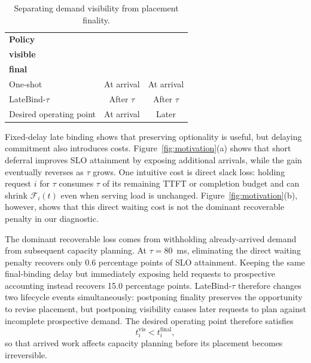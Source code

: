 \documentclass[letterpaper,twocolumn,10pt]{article}
\begin{document}
\begin{table}[t]
    \centering
    \small
    \caption{Separating demand visibility from placement finality.}
    \label{tab:problem:operating-points}

    \renewcommand{\arraystretch}{1.25}

    \begin{tabular*}{\columnwidth}{
        @{\extracolsep{\fill}}
        lcc
        @{}
    }
        \toprule
        \textbf{Policy} &
        \makecell{\textbf{Demand}\\\textbf{visible}} &
        \makecell{\textbf{Placement}\\\textbf{final}} \\
        \midrule
        One-shot                & At arrival   & At arrival   \\
        LateBind-$\tau$         & After $\tau$ & After $\tau$ \\
        Desired operating point & At arrival   & Later        \\
        \bottomrule
    \end{tabular*}
\end{table}

Fixed-delay late binding shows that preserving optionality is useful, but
delaying commitment also introduces costs.
Figure~\ref{fig:motivation}(a) shows that short deferral improves SLO attainment
by exposing additional arrivals, while the gain eventually reverses as
$\tau$ grows.
One intuitive cost is direct slack loss: holding request $i$ for $\tau$
consumes $\tau$ of its remaining TTFT or completion budget and can shrink
$\mathcal{F}_i(t)$ even when serving load is unchanged.
Figure~\ref{fig:motivation}(b), however, shows that this direct waiting cost is
not the dominant recoverable penalty in our diagnostic.

The dominant recoverable loss comes from withholding already-arrived demand
from subsequent capacity planning.
At $\tau=80$~ms, eliminating the direct waiting penalty recovers only
0.6 percentage points of SLO attainment.
Keeping the same final-binding delay but immediately exposing held requests to
prospective accounting instead recovers 15.0 percentage points.
LateBind-$\tau$ therefore changes two lifecycle events simultaneously:
postponing finality preserves the opportunity to revise placement, but
postponing visibility causes later requests to plan against incomplete
prospective demand.
The desired operating point therefore satisfies
\begin{equation}
    t_i^{\mathrm{vis}} < t_i^{\mathrm{final}},
    \label{eq:problem:visibility-before-finality}
\end{equation}
so that arrived work affects capacity planning before its placement becomes
irreversible.
\end{document}
